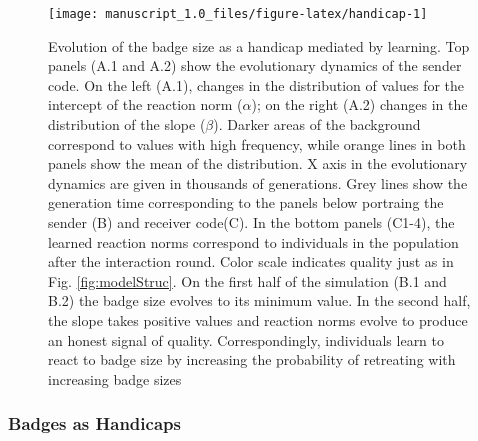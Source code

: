 \documentclass[
  12pt,
]{article}
\begin{document}
\begin{figure}

{\centering \texttt{[image: manuscript\_1.0\_files/figure-latex/handicap-1]} 

}

\caption{Evolution of the badge size as a handicap mediated by learning. Top panels (A.1 and A.2) show the evolutionary dynamics of the sender code. On the left (A.1), changes in the distribution of values for the intercept of the reaction norm ($\alpha$); on the right (A.2) changes in the distribution of the slope ($\beta$). Darker areas of the background correspond to values with high frequency, while orange lines in both panels show the mean of the distribution. X axis in the evolutionary dynamics are given in thousands of generations. Grey lines show the generation time corresponding to the panels below portraing the sender (B) and receiver code(C). In the bottom panels (C1-4), the learned reaction norms correspond to individuals in the population after the interaction round. Color scale indicates quality just as in Fig. \ref{fig:modelStruc}. On the first half of the simulation (B.1 and B.2) the badge size evolves to its minimum value. In the second half, the slope takes positive values and reaction norms evolve to produce an honest signal of quality. Correspondingly, individuals learn to react to badge size by increasing the probability of retreating with increasing badge sizes}\label{fig:handicap}
\end{figure}

\hypertarget{badges-as-handicaps}{%
\subsubsection{Badges as Handicaps}\label{badges-as-handicaps}}
\end{document}
